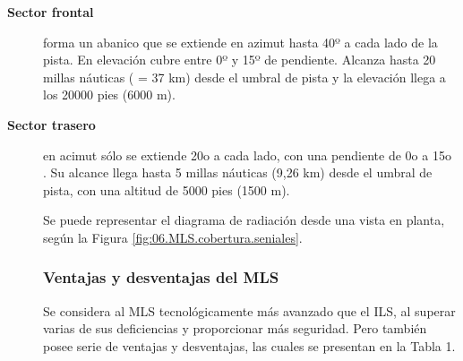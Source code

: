 \begin{description}
\item[\bf Sector frontal]  forma un abanico que se
  extiende en azimut hasta 40º a cada lado de la pista.  En elevación
  cubre entre 0º y 15º de pendiente. Alcanza hasta 20 millas náuticas
  ( = 37 km) desde el umbral de pista y la elevación llega a los 20000
  pies (6000 m).


\item [\bf Sector trasero] en acimut sólo se extiende 20o a cada lado, con una pendiente de 0o a 15o . Su
alcance llega hasta 5 millas náuticas (9,26 km) desde el umbral de pista, con una altitud de
5000 pies (1500 m).

Se puede representar el diagrama de radiación desde una vista en planta, según la Figura \ref{fig:06.MLS.cobertura.seniales}.


\subsubsection{Ventajas y desventajas del MLS}
\label{sec:06.MLS.ventajas+desventajas}

Se considera al MLS tecnológicamente más avanzado que el ILS, al superar varias de sus deficiencias y proporcionar más seguridad. Pero también posee serie de ventajas y desventajas, las cuales se
presentan en la Tabla 1.
\end{description}

